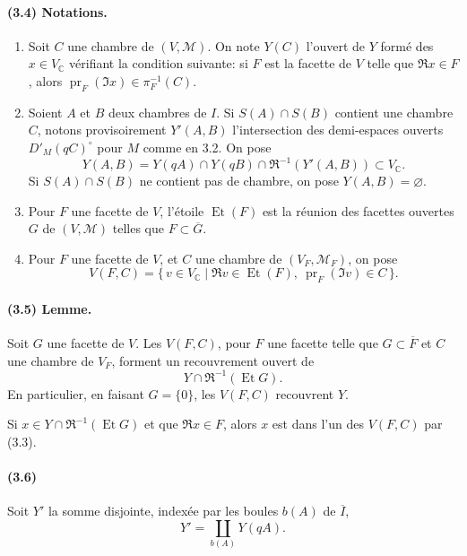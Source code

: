 \documentclass[10pt]{article}
\newcommand{\C}{\mathbb C}
\begin{document}
\paragraph{(3.4) Notations.}
\begin{enumerate}[label=(\roman*)]
\item Soit \(C\) une chambre de \((V,\mathcal M)\). On note \(Y(C)\) l'ouvert de \(Y\) formé des \(x\in V_\C\) vérifiant la condition suivante: si \(F\) est la facette de \(V\) telle que \(\Re x\in F\), alors \(\operatorname{pr}_F(\Im x)\in \pi_F^{-1}(C)\).
\item Soient \(A\) et \(B\) deux chambres de \(I\). Si \(S(A)\cap S(B)\) contient une chambre \(C\), notons provisoirement \(Y'(A,B)\) l'intersection des demi-espaces ouverts \(D'_M(qC)^\circ\) pour \(M\) comme en 3.2. On pose
\[
Y(A,B)=Y(qA)\cap Y(qB)\cap \Re^{-1}(Y'(A,B))\subset V_\C.
\]
Si \(S(A)\cap S(B)\) ne contient pas de chambre, on pose \(Y(A,B)=\varnothing\).
\item Pour \(F\) une facette de \(V\), l'étoile \(\operatorname{Et}(F)\) est la réunion des facettes ouvertes \(G\) de \((V,\mathcal M)\) telles que \(F\subset \overline G\).
\item Pour \(F\) une facette de \(V\), et \(C\) une chambre de \((V_F,\mathcal M_F)\), on pose
\[
V(F,C)=\{\,v\in V_\C\mid \Re v\in\operatorname{Et}(F),\ \operatorname{pr}_F(\Im v)\in C\,\}.
\]
\end{enumerate}

\paragraph{(3.5) Lemme.} Soit \(G\) une facette de \(V\). Les \(V(F,C)\), pour \(F\) une facette telle que \(G\subset\overline F\) et \(C\) une chambre de \(V_F\), forment un recouvrement ouvert de
\[
Y\cap \Re^{-1}(\operatorname{Et}G).
\]
En particulier, en faisant \(G=\{0\}\), les \(V(F,C)\) recouvrent \(Y\).

Si \(x\in Y\cap\Re^{-1}(\operatorname{Et}G)\) et que \(\Re x\in F\), alors \(x\) est dans l'un des \(V(F,C)\) par (3.3).

\paragraph{(3.6)} Soit \(Y'\) la somme disjointe, indexée par les boules \(b(A)\) de \(\overline I\),
\[
Y'=\coprod_{b(A)}Y(qA).
\]
\end{document}
